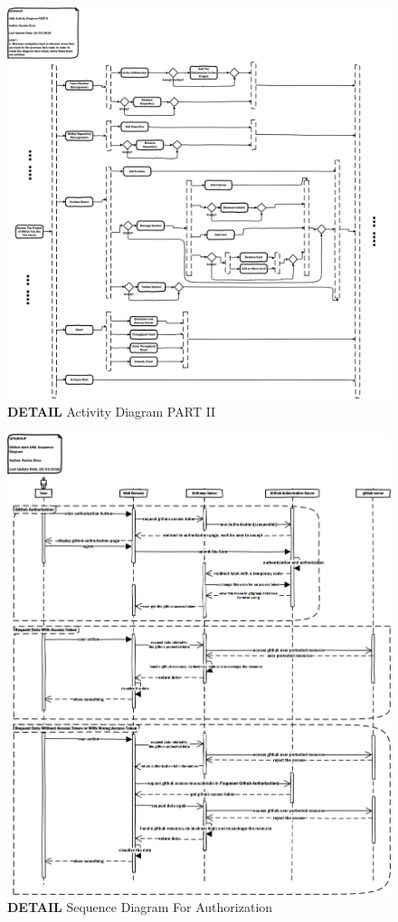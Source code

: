 \documentclass[12pt,a4paper]{report}
\begin{document}
\begin{figure}[h]
	\centering
	\includegraphics[width=\textwidth]{./pics/ActivatyDiagramPARTII.png}
	\caption{\textbf{DETAIL} Activity Diagram PART II}
	\label{fig2}
\end{figure}

\begin{figure}[h]
	\centering
	\includegraphics[width=\textwidth]{./pics/AuthSequenceDiagram.png}
	\caption{\textbf{DETAIL} Sequence Diagram For Authorization}
\end{figure}
\end{document}
